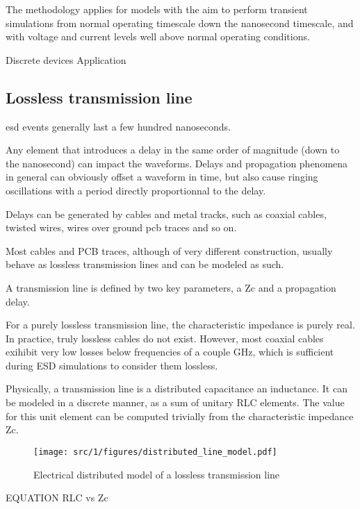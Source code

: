The methodology applies for models with the aim to perform transient simulations from normal operating timescale down the nanosecond timescale, and with voltage and current levels well above normal operating conditions.

Discrete devices
Application

\subsection{Lossless transmission line}

\gls{esd} events generally last a few hundred nanoseconds.

Any element that introduces a delay in the same order of magnitude (down to the nanosecond) can impact the waveforms.
Delays and propagation phenomena in general can obviously offset a waveform in time,
but also cause ringing oscillations with a period directly proportionnal to the delay.

Delays can be generated by cables and metal tracks, such as coaxial cables, twisted wires, wires over ground \gls{pcb} traces and so on.

Most cables and PCB traces, although of very different construction, usually behave as lossless transmission lines and can be modeled as such.

A transmission line is defined by two key parameters, a \gls{Zc} and a propagation delay.


For a purely lossless transmission line, the characteristic impedance is purely real.
In practice, truly lossless cables do not exist.
However, most coaxial cables exihibit very low losses below frequencies of a couple GHz, which is sufficient during ESD simulations to consider them lossless.

Physically, a transmission line is a distributed capacitance an inductance.
It can be modeled in a discrete manner, as a sum of unitary RLC elements.
The value for this unit element can be computed trivially from the characteristic impedance \gls{Zc}.

\begin{figure}[!h]
  \centering
  \texttt{[image: src/1/figures/distributed\_line\_model.pdf]}
  \caption{Electrical distributed model of a lossless transmission line}
  \label{fig:dis-line-model}
\end{figure}

EQUATION RLC vs Zc

